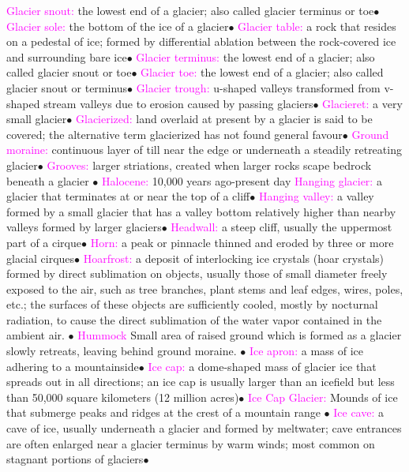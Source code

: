 \documentclass{article}
\newcommand{\ddd}{$\bullet$}
\newcommand{\pink}[1]{\textcolor{magenta}{#1}}
\newcommand{\vocab}[1]{{\pink{#1}}}
\begin{document}
\begin{multicols*}{4}
		\vocab{        Glacier snout: } the lowest end of a glacier; also called glacier terminus or toe\ddd
		\vocab{        Glacier sole: } the bottom of the ice of a glacier\ddd
		\vocab{        Glacier table: } a rock that resides on a pedestal of ice; formed by differential ablation between the rock-covered ice and surrounding bare ice\ddd
		\vocab{        Glacier terminus: } the lowest end of a glacier; also called glacier snout or toe\ddd
		\vocab{        Glacier toe: } the lowest end of a glacier; also called glacier snout or terminus\ddd
		\vocab{        Glacier trough: } u-shaped valleys transformed from v-shaped stream valleys due to erosion caused by passing glaciers\ddd
		\vocab{        Glacieret: } a very small glacier\ddd
		\vocab{        Glacierized: } land overlaid at present by a glacier is said to be covered; the alternative term glacierized has not found general favour\ddd
		\vocab{        Ground moraine: } continuous layer of till near the edge or underneath a steadily retreating glacier\ddd
		\vocab{Grooves: } larger striations, created when larger rocks scape bedrock beneath a glacier \ddd
		\vocab{ Halocene: } 10,000 years ago-present day
		\vocab{        Hanging glacier: } a glacier that terminates at or near the top of a cliff\ddd
		\vocab{        Hanging valley: } a valley formed by a small glacier that has a valley bottom relatively higher than nearby valleys formed by larger glaciers\ddd
		\vocab{        Headwall: } a steep cliff, usually the uppermost part of a cirque\ddd
		\vocab{        Horn: } a peak or pinnacle thinned and eroded by three or more glacial cirques\ddd
		\vocab{Hoarfrost:} a deposit of interlocking ice crystals (hoar crystals) formed by direct sublimation on objects, usually those of small diameter freely exposed to the air, such as tree branches, plant stems and leaf edges, wires, poles, etc.; the surfaces of these objects are sufficiently cooled, mostly by nocturnal radiation, to cause the direct sublimation of the water vapor contained in the ambient air.
		\ddd
		\vocab{Hummock} Small area of raised ground which is formed as a glacier slowly retreats, leaving behind ground moraine. \ddd
		\vocab{        Ice apron: } a mass of ice adhering to a mountainside\ddd
		\vocab{        Ice cap: } a dome-shaped mass of glacier ice that spreads out in all directions; an ice cap is usually larger than an icefield but less than 50,000 square kilometers (12 million acres)\ddd
		\vocab{Ice Cap Glacier: } Mounds of ice that submerge peaks and ridges at the crest of a mountain range \ddd
		\vocab{        Ice cave: } a cave of ice, usually underneath a glacier and formed by meltwater; cave entrances are often enlarged near a glacier terminus by warm winds; most common on stagnant portions of glaciers\ddd

\end{multicols*}
\end{document}
